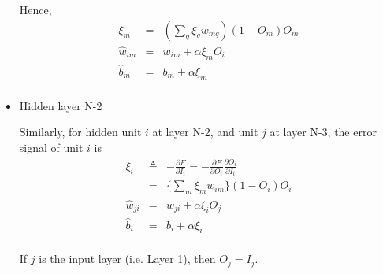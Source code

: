 \documentclass[9pt]{article}
\begin{document}
\begin{itemize}
Hence,
\begin{eqnarray*}
\xi_m & = & (\sum_q \xi_q w_{mq}) (1 - O_m) O_m \\
\hat{w}_{im} & = & w_{im} + \alpha \xi_m O_i \\
\hat{b}_{m} & = & b_m + \alpha \xi_m \\
\end{eqnarray*}


\item Hidden layer N-2

Similarly, for hidden unit $i$ at layer N-2, and unit $j$ at layer N-3,
the error signal of unit $i$ is
\begin{eqnarray*}
\xi_i & \triangleq & - \frac{\partial F}{\partial I_i} =  - \frac{\partial F}{\partial O_i} \frac{\partial O_i}{\partial I_i} \\
 & = & \{\sum_m \xi_m w_{im}\} (1- O_i) O_i \\
\hat{w}_{ji} & = & w_{ji} + \alpha \xi_i O_j \\
\hat{b}_{i} & = & b_i + \alpha \xi_i \\
\end{eqnarray*}

If $j$ is the input layer (i.e. Layer 1), then $O_j = I_j$.
\end{itemize}
\end{document}
